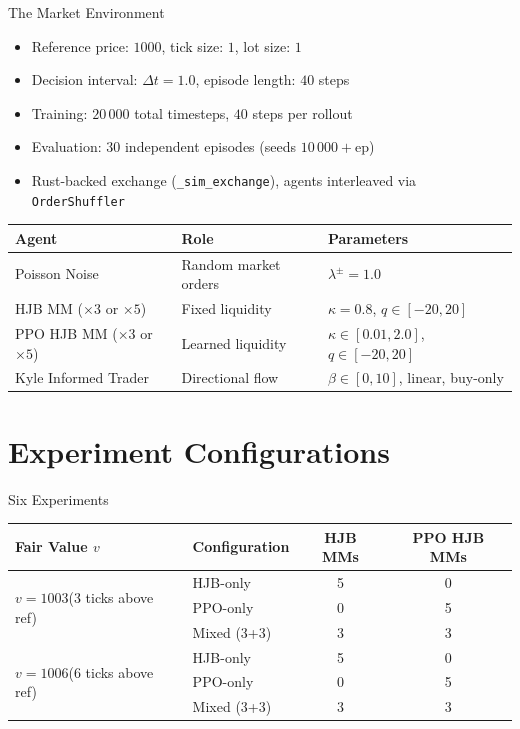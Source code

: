 \documentclass[10pt,aspectratio=169]{beamer}
\begin{document}
\begin{frame}{The Market Environment}
  \begin{itemize}
    \item Reference price: $1000$, tick size: $1$, lot size: $1$
    \item Decision interval: $\Delta t = 1.0$, episode length: $40$ steps
    \item Training: $20\,000$ total timesteps, $40$ steps per rollout
    \item Evaluation: $30$ independent episodes (seeds $10\,000+$ep)
    \item Rust-backed exchange (\texttt{\_sim\_exchange}), agents interleaved via \texttt{OrderShuffler}
  \end{itemize}

  \vspace{8pt}
  \begin{center}
  \begin{tabular}{lll}
    \toprule
    Agent & Role & Parameters \\
    \midrule
    Poisson Noise & Random market orders & $\lambda^\pm = 1.0$ \\
    HJB MM ($\times 3$ or $\times 5$) & Fixed liquidity & $\kappa = 0.8$, $q \in [-20,20]$ \\
    PPO HJB MM ($\times 3$ or $\times 5$) & Learned liquidity & $\kappa \in [0.01, 2.0]$, $q \in [-20,20]$ \\
    Kyle Informed Trader & Directional flow & $\beta \in [0, 10]$, linear, buy-only \\
    \bottomrule
  \end{tabular}
  \end{center}
\end{frame}

\section{Experiment Configurations}

\begin{frame}{Six Experiments}
  \begin{center}
  \begin{tabular}{llcc}
    \toprule
    Fair Value $v$ & Configuration & HJB MMs & PPO HJB MMs \\
    \midrule
    \multirow{3}{*}{$v = 1003$\;(3 ticks above ref)} &
      HJB-only & 5 & 0 \\
    & PPO-only & 0 & 5 \\
    & Mixed (3+3) & 3 & 3 \\
    \midrule
    \multirow{3}{*}{$v = 1006$\;(6 ticks above ref)} &
      HJB-only & 5 & 0 \\
    & PPO-only & 0 & 5 \\
    & Mixed (3+3) & 3 & 3 \\
    \bottomrule
  \end{tabular}
  \end{center}
\end{frame}
\end{document}
